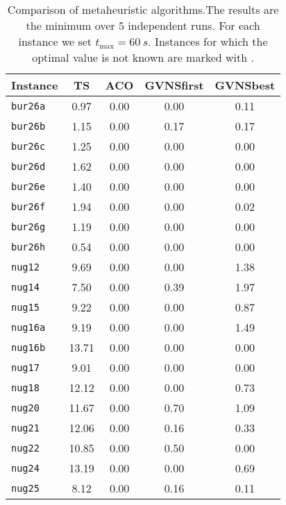 \begin{table}
			\centering
		\caption[Comparison of metaheuristic algorithms]{Comparison of 			metaheuristic algorithms.The results are the minimum over $5$ independent runs. For each instance we set $t_\mathrm{max}=\SI{60}{s}$. Instances for which the optimal value is not known are marked with \virgolette{*}.} \label{tab:Finalcomparison}	\begin{tabular}{l*{4}{S[table-format=2.2]}}

	\toprule
	Instance &  {TS} & {ACO} & {GVNSfirst} & {GVNSbest}\\
	\midrule
	\texttt{bur26a          } &  0.97 &  0.00 &  0.00 &  0.11 \\
	\texttt{bur26b          } &  1.15 &  0.00 &  0.17 &  0.17 \\
	\texttt{bur26c          } &  1.25 &  0.00 &  0.00 &  0.00 \\
	\texttt{bur26d          } &  1.62 &  0.00 &  0.00 &  0.00 \\
	\texttt{bur26e          } &  1.40 &  0.00 &  0.00 &  0.00 \\
	\texttt{bur26f          } &  1.94 &  0.00 &  0.00 &  0.02 \\
	\texttt{bur26g          } &  1.19 &  0.00 &  0.00 &  0.00 \\
	\texttt{bur26h          } &  0.54 &  0.00 &  0.00 &  0.00 \\
	\texttt{nug12           } & 9.69 & 0.00 & 0.00 & 1.38  \\
	\texttt{nug14           } & 7.50 & 0.00 & 0.39 & 1.97  \\
	\texttt{nug15           } & 9.22 & 0.00 & 0.00 & 0.87  \\
	\texttt{nug16a          } & 9.19 & 0.00 & 0.00 & 1.49  \\
	\texttt{nug16b          } & 13.71& 0.00 & 0.00 & 0.00  \\
	\texttt{nug17           } & 9.01 & 0.00 & 0.00 & 0.00  \\
	\texttt{nug18           } & 12.12 &  0.00 &  0.00 &  0.73 \\
	\texttt{nug20           } & 11.67 &  0.00 &  0.70 &  1.09 \\
	\texttt{nug21           } & 12.06 &  0.00 &  0.16 &  0.33 \\
	\texttt{nug22           } & 10.85 &  0.00 &  0.50 &  0.00 \\
	\texttt{nug24           } & 13.19 &  0.00 &  0.00 &  0.69 \\
	\texttt{nug25           } &  8.12 &  0.00 &  0.16 &  0.11 \\

\end{tabular}
\end{table}
